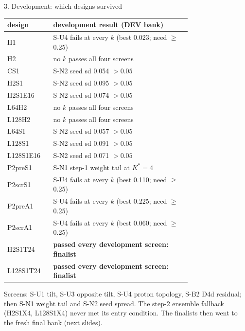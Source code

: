 \documentclass[aspectratio=169,10pt]{beamer}
\def\evidencetext{}
\begin{document}
\gdef\evidencetext{\texttt{dev/SCREENS-20260927-3d.json}; \texttt{DEVELOPMENT-20260926.md}}
\begin{frame}{3. Development: which designs survived}
{\scriptsize
\begin{tabular}{l>{\raggedright\arraybackslash}p{0.75\linewidth}}
\toprule
design & development result (DEV bank) \\
\midrule
H1 & S-U4 fails at every $k$ (best 0.023; need $\ge$ 0.25) \\
H2 & no $k$ passes all four screens \\
CS1 & S-N2 seed sd 0.054 $> 0.05$ \\
H2S1 & S-N2 seed sd 0.095 $> 0.05$ \\
H2S1E16 & S-N2 seed sd 0.074 $> 0.05$ \\
L64H2 & no $k$ passes all four screens \\
L128H2 & no $k$ passes all four screens \\
L64S1 & S-N2 seed sd 0.057 $> 0.05$ \\
L128S1 & S-N2 seed sd 0.091 $> 0.05$ \\
L128S1E16 & S-N2 seed sd 0.071 $> 0.05$ \\
P2preS1 & S-N1 step-1 weight tail at $K^*=4$ \\
P2scrS1 & S-U4 fails at every $k$ (best 0.110; need $\ge$ 0.25) \\
P2preA1 & S-U4 fails at every $k$ (best 0.225; need $\ge$ 0.25) \\
P2scrA1 & S-U4 fails at every $k$ (best 0.060; need $\ge$ 0.25) \\
H2S1T24 & \textbf{passed every development screen: finalist} \\
L128S1T24 & \textbf{passed every development screen: finalist} \\
\bottomrule
\end{tabular}}\par\vspace{0.1cm}\tiny Screens: S-U1 tilt, S-U3 opposite tilt, S-U4 proton topology, S-B2 D4d residual; then S-N1 weight tail and S-N2 seed spread. The step-2 ensemble fallback (H2S1X4, L128S1X4) never met its entry condition. The finalists then went to the fresh final bank (next slides).
\end{frame}
\end{document}

